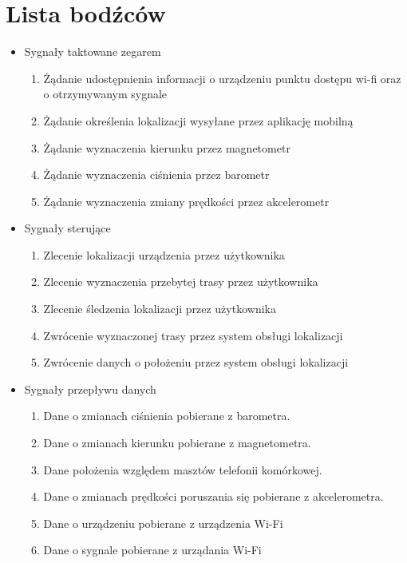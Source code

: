 \documentclass[11pt]{article}
\begin{document}
	\section{Lista bodźców}
	\begin{itemize}
		\item Sygnały taktowane zegarem
		\begin{enumerate}
			
		\item Żądanie udostępnienia informacji o urządzeniu punktu dostępu wi-fi oraz o otrzymywanym sygnale
	    \item Żądanie określenia lokalizacji wysyłane przez aplikację mobilną
		\item Żądanie wyznaczenia kierunku przez magnetometr
		\item Żądanie wyznaczenia ciśnienia przez barometr
		\item Żądanie wyznaczenia zmiany prędkości przez akcelerometr
		
		\end{enumerate}
		\item Sygnały sterujące
		\begin{enumerate}
		\item Zlecenie lokalizacji urządzenia przez użytkownika
		\item Zlecenie wyznaczenia przebytej trasy przez użytkownika
		\item Zlecenie śledzenia lokalizacji przez użytkownika
	    \item Zwrócenie wyznaczonej trasy przez system obsługi lokalizacji
		\item Zwrócenie danych o położeniu  przez system obsługi lokalizacji
				
		\end{enumerate}
		\item Sygnały przepływu danych
		\begin{enumerate}
		\item	Dane o zmianach ciśnienia pobierane z barometra.
		\item	Dane o zmianach kierunku pobierane z magnetometra.
		\item	Dane położenia względem masztów telefonii komórkowej.
		\item	Dane o zmianach prędkości poruszania się pobierane z akcelerometra.
		\item	Dane o urządzeniu pobierane z urządzenia Wi-Fi
		\item	Dane o sygnale pobierane z urządania Wi-Fi
				
		\end{enumerate}
	\end{itemize}
	\newpage
\end{document}
